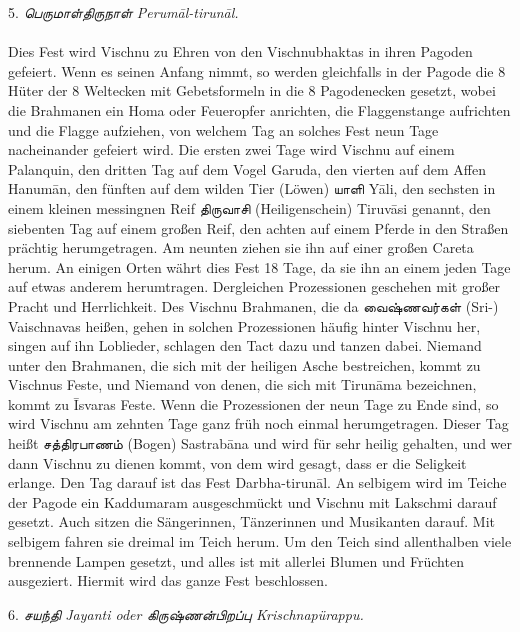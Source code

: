 \documentclass{article}
\newcommand{\TamilText}[1]{\texttamil{#1}}
\newcommand{\tam}[1]{\TamilText{#1}}
\begin{document}
\begin{center}
5. \emph{\tam{பெருமாள்திருநாள்} Perum\={a}l-tirun\={a}l.}
\end{center}
\paragraph{}
Dies Fest wird Vischnu zu Ehren von den Vischnubhaktas in ihren Pagoden gefeiert. Wenn es seinen Anfang nimmt, so werden gleichfalls in der Pagode die 8 Hüter der 8 Weltecken mit Gebetsformeln in die 8 Pagodenecken gesetzt, wobei die Brahmanen ein Homa oder Feueropfer anrichten, die Flaggenstange aufrichten und die Flagge aufziehen, von welchem Tag an solches Fest neun Tage nacheinander gefeiert wird. Die ersten zwei Tage wird Vischnu auf einem Palanquin, den dritten Tag auf dem Vogel Garuda, den vierten auf dem Affen Hanum\={a}n, den fünften auf dem wilden Tier (Löwen) \tam{யாளி} Y\={a}li, den sechsten in einem kleinen messingnen Reif \tam{திருவாசி} (Heiligenschein) Tiruv\={a}si genannt, den siebenten Tag auf einem großen Reif, den achten auf einem Pferde in den Straßen prächtig herumgetragen. Am neunten ziehen sie ihn auf einer großen Careta herum. An einigen Orten währt dies Fest 18 Tage, da sie ihn an einem jeden Tage auf etwas anderem herumtragen. Dergleichen Prozessionen geschehen mit großer Pracht und Herrlichkeit. Des Vischnu Brahmanen, die da \tam{வைஷ்ணவர்கள்} (Sri-) Vaischnavas heißen, gehen in solchen Prozessionen häufig hinter Vischnu her, singen auf ihn Loblieder, schlagen den Tact dazu und tanzen dabei. Niemand unter den Brahmanen, die sich mit der heiligen Asche bestreichen, kommt zu Vischnus Feste, und Niemand von denen, die sich mit Tirun\={a}ma bezeichnen, kommt zu \={I}svaras Feste. Wenn die Prozessionen der neun Tage zu Ende sind, so wird Vischnu am zehnten Tage ganz früh noch einmal herumgetragen. Dieser Tag heißt \tam{சத்திரபாணம்} (Bogen) Sastrab\={a}na und wird für sehr heilig gehalten, und wer dann Vischnu zu dienen kommt, von dem wird gesagt, dass er die Seligkeit erlange. Den Tag darauf ist das Fest Darbha-tirun\={a}l. An selbigem wird im Teiche der Pagode ein Kaddumaram ausgeschmückt und Vischnu mit Lakschmi darauf gesetzt. Auch sitzen die Sängerinnen, Tänzerinnen und Musikanten darauf. Mit selbigem fahren sie dreimal im Teich herum. Um den Teich sind allenthalben viele brennende Lampen gesetzt, und alles ist mit allerlei Blumen und Früchten ausgeziert. Hiermit wird das ganze Fest beschlossen.

\begin{center}
6. \emph{\tam{சயந்தி} Jayanti oder \tam{கிருஷ்ணன்பிறப்பு} Krischnapürappu.}
\end{center}
\end{document}
